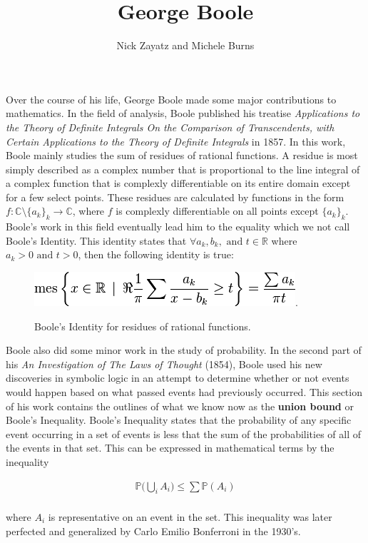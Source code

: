 \documentclass[12]{article} %
\title{George Boole}
\author{Nick Zayatz and Michele Burns}
\begin{document}
\maketitle %

Over the course of his life, George Boole made some major contributions to mathematics. In the field of analysis, Boole published his treatise \textit{Applications to the Theory of Definite Integrals On the Comparison of Transcendents, with Certain Applications to the Theory of Definite Integrals} in 1857. In this work, Boole mainly studies the sum of residues of rational functions. A residue is most simply described as a complex number that is proportional to the line integral of a complex function that is complexly differentiable on its entire domain except for a few select points. These residues are calculated by functions in the form $f: \mathbb{C}\setminus \{a_{k}\}_{k} \rightarrow \mathbb{C}$, where $f$ is complexly differentiable on all points except $\{a_{k}\}_{k}$. Boole's work in this field eventually lead him to the equality which we not call Boole's Identity. This identity states that $\forall a_{k},b_{k}, \text{ and } t \in \mathbb{R}$ where $a_{k} > 0 \text{ and } t > 0$, then the following identity is true:

\begin{figure}[H]
\centerline{\includegraphics[scale=0.8]{boolesIdentity}.}
\caption{Boole's Identity for residues of rational functions.}\label{fig1}
\end{figure}

Boole also did some minor work in the study of probability. In the second part of his \textit{An Investigation of The Laws of Thought} (1854), Boole used his new discoveries in symbolic logic in an attempt to determine whether or not events would happen based on what passed events had previously occurred. This section of his work contains the outlines of what we know now as the \textbf{union bound} or Boole's Inequality. Boole's Inequality states that the probability of any specific event occurring in a set of events is less that the sum of the probabilities of all of the events in that set. This can be expressed in mathematical terms by the inequality

\begin{eqnarray*}
\mathbb{P}\bigg(\bigcup\limits_{i} A_{i}\bigg)\leq\sum\mathbb{P}(A_{i})
\end{eqnarray*}\\
where $A_{i}$ is representative on an event in the set. This inequality was later perfected and generalized by Carlo Emilio Bonferroni in the 1930's.
\end{document}
